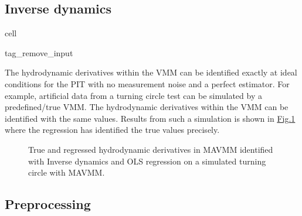 \documentclass[review]{elsarticle}
\begin{document}
\subsection{Inverse dynamics}
\label{\detokenize{06.40_results_inverse_dynamics:inverse-dynamics}}\label{\detokenize{06.40_results_inverse_dynamics::doc}}
\begin{sphinxuseclass}{cell}
\begin{sphinxuseclass}{tag_remove_input}
\end{sphinxuseclass}
\end{sphinxuseclass}
  
The hydrodynamic derivatives within the VMM can be identified exactly at ideal conditions for the PIT with no measurement noise and a perfect estimator. For example, artificial data from a turning circle test can be simulated by a pre\sphinxhyphen{}defined/true VMM. The hydrodynamic derivatives within the VMM can be identified with the same values. Results from such a simulation is shown in \hyperref[\detokenize{06.40_results_inverse_dynamics:fig-bar-parameters}]{Fig.\@ \ref{\detokenize{06.40_results_inverse_dynamics:fig-bar-parameters}}} where the regression has identified the true values precisely.

 \begin{figure}[H]
 \centering
 \capstart

 \noindent{}
 \caption{True and regressed hydrodynamic derivatives in MAVMM identified with Inverse dynamics and OLS regression on a simulated turning circle with MAVMM.}\label{\detokenize{06.40_results_inverse_dynamics:fig-bar-parameters}}\end{figure}


\subsection{Preprocessing}
\label{\detokenize{06.31_results_noise:preprocessor}}\label{\detokenize{06.31_results_noise::doc}}
  
\end{document}
